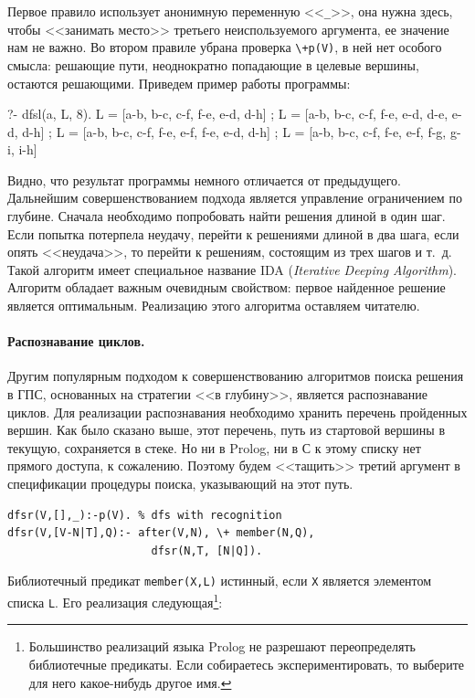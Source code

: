 \documentclass[a4paper,14pt, openany, twoside, final]{extbook} %
\newcommand{\eeng}[1]{\emph{\foreignlanguage{english}{#1}}}
\begin{document}
Первое правило использует анонимную переменную <<\texttt{\_}>>, она нужна здесь, чтобы <<занимать место>> третьего неиспользуемого аргумента, ее значение нам не важно.  Во втором правиле убрана проверка \texttt{\backslash +p(V)}, в ней нет особого смысла: решающие пути, неоднократно попадающие в целевые вершины, остаются решающими.  Приведем пример работы программы:

\begin{proexp}
?- dfsl(a, L, 8).
L = [a-b, b-c, c-f, f-e, e-d, d-h] ;
L = [a-b, b-c, c-f, f-e, e-d, d-e, e-d, d-h] ;
L = [a-b, b-c, c-f, f-e, e-f, f-e, e-d, d-h] ;
L = [a-b, b-c, c-f, f-e, e-f, f-g, g-i, i-h]
\end{proexp}

Видно, что результат программы немного отличается от предыдущего.  Дальнейшим совершенствованием подхода является управление ограничением по глубине.  Сначала необходимо попробовать найти решения длиной в один шаг.  Если попытка потерпела неудачу, перейти к решениями длиной в два шага, если опять <<неудача>>, то перейти к решениям, состоящим из трех шагов и т.~д.  Такой алгоритм имеет специальное название IDA (\eeng{Iterative Deeping Algorithm}).  Алгоритм обладает важным очевидным свойством: первое найденное решение является оптимальным.  Реализацию этого алгоритма оставляем читателю.

\paragraph{Распознавание циклов.}  Другим популярным подходом к совершенствованию алгоритмов поиска решения в ГПС, основанных на стратегии <<в глубину>>, является распознавание циклов.  Для реализации распознавания необходимо хранить перечень пройденных вершин.  Как было сказано выше, этот перечень, путь из стартовой вершины в текущую, сохраняется в стеке.  Но ни в Prolog, ни в С к этому списку нет прямого доступа, к сожалению.  Поэтому будем <<тащить>> третий аргумент в спецификации процедуры поиска, указывающий на этот путь.

\begin{verbatim}
dfsr(V,[],_):-p(V). % dfs with recognition
dfsr(V,[V-N|T],Q):- after(V,N), \+ member(N,Q),
                      dfsr(N,T, [N|Q]).
\end{verbatim}


Библиотечный предикат \texttt{member(X,L)} истинный, если \texttt{X} является элементом списка \texttt{L}.  Его реализация следующая\footnote{Большинство реализаций языка Prolog не разрешают переопределять библиотечные предикаты.  Если собираетесь экспериментировать, то выберите для него какое-нибудь другое имя.}:
\end{document}
